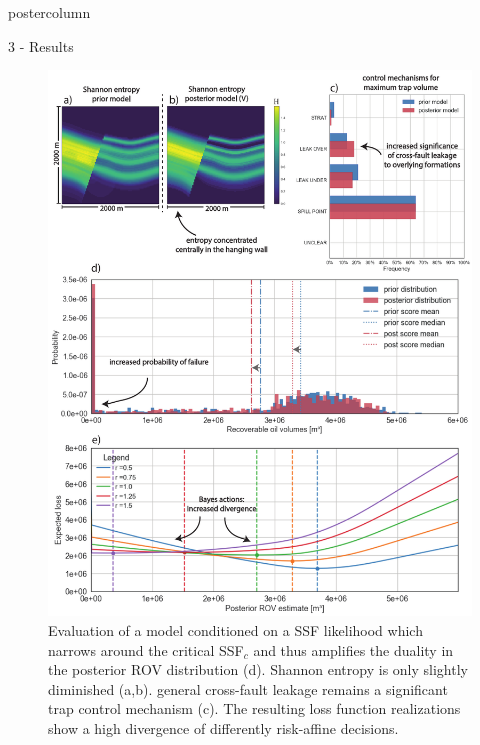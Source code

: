 \documentclass{beamer}
\begin{document}
\begin{frame}
\begin{columns}
\begin{column}{.499\textwidth}
\begin{beamercolorbox}[center]{postercolumn}
\begin{minipage}{.98\textwidth}
{\begin{myblock}{3 - Results}
\begin{figure}
\begin{minipage}{0.99\textwidth}
\begin{minipage}[t]{0.49\textwidth}
				\label{fig:ML4}
			\end{minipage}\hfill
			\begin{minipage}[t]{0.49\textwidth}
				\centering\includegraphics[width=1\textwidth]{figures/ML5.pdf}
				\caption{Evaluation of a model conditioned on a SSF likelihood which narrows around the critical SSF$_c$ and thus amplifies the duality in the posterior ROV distribution (d). Shannon entropy is only slightly diminished (a,b). general cross-fault leakage remains a significant trap control mechanism (c). The resulting loss function realizations show a high divergence of differently risk-affine decisions.}

\end{minipage}
\end{minipage}
\end{figure}
\end{myblock}}
\end{minipage}
\end{beamercolorbox}
\end{column}
\end{columns}
\end{frame}
\end{document}

